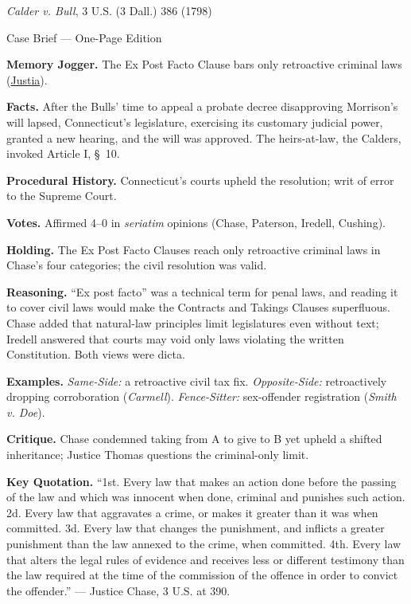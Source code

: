 \documentclass[12pt]{article}
\begin{document}
\begin{center}
{\Large \textit{Calder v. Bull}, 3 U.S. (3 Dall.) 386 (1798)\par}
\vspace{0.3em}
{\normalsize Case Brief --- One-Page Edition\par}
\end{center}

\textbf{Memory Jogger.} The Ex Post Facto Clause bars only retroactive criminal laws (\href{https://supreme.justia.com/cases/federal/us/3/386/}{Justia}).

\textbf{Facts.} After the Bulls' time to appeal a probate decree disapproving Morrison's will lapsed, Connecticut's legislature, exercising its customary judicial power, granted a new hearing, and the will was approved. The heirs-at-law, the Calders, invoked Article I, \S~10.

\textbf{Procedural History.} Connecticut's courts upheld the resolution; writ of error to the Supreme Court.

\textbf{Votes.} Affirmed 4--0 in \textit{seriatim} opinions (Chase, Paterson, Iredell, Cushing).

\textbf{Holding.} The Ex Post Facto Clauses reach only retroactive criminal laws in Chase's four categories; the civil resolution was valid.

\textbf{Reasoning.} ``Ex post facto'' was a technical term for penal laws, and reading it to cover civil laws would make the Contracts and Takings Clauses superfluous. Chase added that natural-law principles limit legislatures even without text; Iredell answered that courts may void only laws violating the written Constitution. Both views were dicta.

\textbf{Examples.} \emph{Same-Side:} a retroactive civil tax fix. \emph{Opposite-Side:} retroactively dropping corroboration (\textit{Carmell}). \emph{Fence-Sitter:} sex-offender registration (\textit{Smith v. Doe}).

\textbf{Critique.} Chase condemned taking from A to give to B yet upheld a shifted inheritance; Justice Thomas questions the criminal-only limit.

\textbf{Key Quotation.} ``1st. Every law that makes an action done before the passing of the law and which was innocent when done, criminal and punishes such action. 2d. Every law that aggravates a crime, or makes it greater than it was when committed. 3d. Every law that changes the punishment, and inflicts a greater punishment than the law annexed to the crime, when committed. 4th. Every law that alters the legal rules of evidence and receives less or different testimony than the law required at the time of the commission of the offence in order to convict the offender.'' --- Justice Chase, 3 U.S. at 390.
\end{document}
